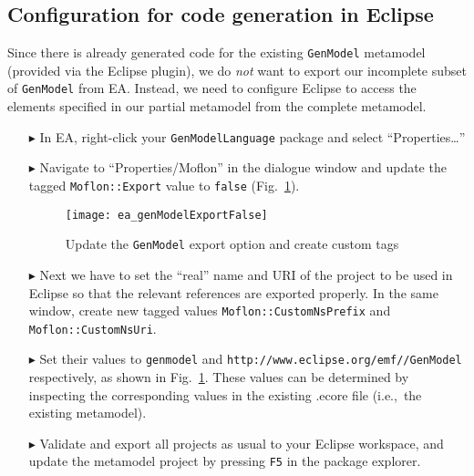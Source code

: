\newpage

\subsection{Configuration for code generation in Eclipse}
\genHeader

Since there is already generated code for the existing \texttt{GenModel} metamodel (provided via the Eclipse plugin), we do \emph{not} want to export our
incomplete subset of \texttt{GenModel} from EA. Instead, we need to configure Eclipse to access the elements specified in our partial metamodel from the
complete metamodel.

\begin{enumerate}

\item[$\blacktriangleright$] In EA, right-click your \texttt{GenModelLanguage} package and select ``Properties\ldots'' 

\item[$\blacktriangleright$] Navigate to ``Properties/Moflon'' in the dialogue window and update the tagged \texttt{Moflon::Export} value to \texttt{false}
(Fig.~\ref{fig_customNS}).

\vspace{0.5cm}

\begin{figure}[htb]
\begin{center}  \texttt{[image: ea\_genModelExportFalse]}
  \caption{Update the \texttt{GenModel} export option and create custom tags}  
  \label{fig_customNS}
\end{center}
\end{figure}

\newpage

\item[$\blacktriangleright$] Next we have to set the ``real'' name and URI of the project to be used in Eclipse so that the relevant references are exported
properly. In the same window, create new tagged values \texttt{Moflon::CustomNsPrefix} and \texttt{Moflon::CustomNsUri}.

\item[$\blacktriangleright$] Set their values to \texttt{genmodel} and \texttt{http://\-www.\-eclipse.\-org/\-emf//\-GenModel} respectively, as shown in
Fig.~\ref{fig_customNS}. These values can be determined by inspecting the corresponding values in the existing .ecore file (i.e.,~the existing metamodel).

\item[$\blacktriangleright$] Validate and export all projects as usual to your Eclipse workspace, and update the metamodel project by pressing \texttt{F5} in
the package explorer.


\end{enumerate}
